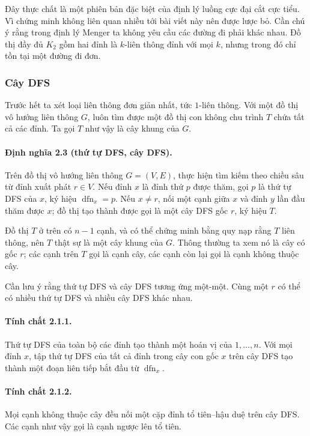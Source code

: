\documentclass[11pt]{article}
\begin{document}
Đây thực chất là một phiên bản đặc biệt của định lý luồng cực đại cắt cực tiểu.
Vì chứng minh không liên quan nhiều tới bài viết này nên được lược bỏ. Cần chú
ý rằng trong định lý Menger ta không yêu cầu các đường đi phải khác nhau. Đồ thị
đầy đủ $K_2$ gồm hai đỉnh là $k$-liên thông đỉnh với mọi $k$, nhưng trong đó chỉ
tồn tại một đường đi đơn.

\subsubsection{Cây DFS}

Trước hết ta xét loại liên thông đơn giản nhất, tức $1$-liên thông. Với một đồ
thị vô hướng liên thông $G$, luôn tìm được một đồ thị con không chu trình $T$
chứa tất cả các đỉnh. Ta gọi $T$ như vậy là cây khung của $G$.

\paragraph{Định nghĩa 2.3 (thứ tự DFS, cây DFS).}
Trên đồ thị vô hướng liên thông $G=(V,E)$, thực hiện tìm kiếm theo chiều sâu từ
đỉnh xuất phát $r\in V$. Nếu đỉnh $x$ là đỉnh thứ $p$ được thăm, gọi $p$ là thứ
tự DFS của $x$, ký hiệu $\operatorname{dfn}_x=p$. Nếu $x\ne r$, nối một cạnh
giữa $x$ và đỉnh $y$ lần đầu thăm được $x$; đồ thị tạo thành được gọi là một cây
DFS gốc $r$, ký hiệu $T$.

Đồ thị $T$ ở trên có $n-1$ cạnh, và có thể chứng minh bằng quy nạp rằng $T$ liên
thông, nên $T$ thật sự là một cây khung của $G$. Thông thường ta xem nó là cây
có gốc $r$; các cạnh trên $T$ gọi là cạnh cây, các cạnh còn lại gọi là cạnh
không thuộc cây.

Cần lưu ý rằng thứ tự DFS và cây DFS tương ứng một-một. Cùng một $r$ có thể có
nhiều thứ tự DFS và nhiều cây DFS khác nhau.

\paragraph{Tính chất 2.1.1.}
Thứ tự DFS của toàn bộ các đỉnh tạo thành một hoán vị của $1,\ldots,n$. Với mọi
đỉnh $x$, tập thứ tự DFS của tất cả đỉnh trong cây con gốc $x$ trên cây DFS tạo
thành một đoạn liên tiếp bắt đầu từ $\operatorname{dfn}_x$.

\paragraph{Tính chất 2.1.2.}
Mọi cạnh không thuộc cây đều nối một cặp đỉnh tổ tiên--hậu duệ trên cây DFS. Các
cạnh như vậy gọi là cạnh ngược lên tổ tiên.
\end{document}
